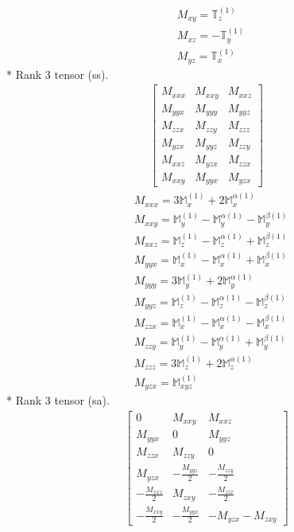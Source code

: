 \documentclass[fleqn,8pt,landscape]{jsarticle}
\begin{document}
\begin{align*}
& M_{xy} = \mathbb{T}_{z}^{(1)} \\
& M_{xz} = - \mathbb{T}_{y}^{(1)} \\
& M_{yz} = \mathbb{T}_{x}^{(1)}
\end{align*}
* Rank 3 tensor (ss).
\begin{align*}
\begin{bmatrix} M_{xxx} & M_{xxy} & M_{xxz} \\ M_{yyx} & M_{yyy} & M_{yyz} \\ M_{zzx} & M_{zzy} & M_{zzz} \\ M_{yzx} & M_{yyz} & M_{zzy} \\ M_{xxz} & M_{yzx} & M_{zzx} \\ M_{xxy} & M_{yyx} & M_{yzx} \end{bmatrix}
\end{align*}
\begin{align*}
& M_{xxx} = 3 \mathbb{M}_{x}^{(1)} + 2 \mathbb{M}_{x}^{\alpha(1)} \\
& M_{xxy} = \mathbb{M}_{y}^{(1)} - \mathbb{M}_{y}^{\alpha(1)} - \mathbb{M}_{y}^{\beta(1)} \\
& M_{xxz} = \mathbb{M}_{z}^{(1)} - \mathbb{M}_{z}^{\alpha(1)} + \mathbb{M}_{z}^{\beta(1)} \\
& M_{yyx} = \mathbb{M}_{x}^{(1)} - \mathbb{M}_{x}^{\alpha(1)} + \mathbb{M}_{x}^{\beta(1)} \\
& M_{yyy} = 3 \mathbb{M}_{y}^{(1)} + 2 \mathbb{M}_{y}^{\alpha(1)} \\
& M_{yyz} = \mathbb{M}_{z}^{(1)} - \mathbb{M}_{z}^{\alpha(1)} - \mathbb{M}_{z}^{\beta(1)} \\
& M_{zzx} = \mathbb{M}_{x}^{(1)} - \mathbb{M}_{x}^{\alpha(1)} - \mathbb{M}_{x}^{\beta(1)} \\
& M_{zzy} = \mathbb{M}_{y}^{(1)} - \mathbb{M}_{y}^{\alpha(1)} + \mathbb{M}_{y}^{\beta(1)} \\
& M_{zzz} = 3 \mathbb{M}_{z}^{(1)} + 2 \mathbb{M}_{z}^{\alpha(1)} \\
& M_{yzx} = \mathbb{M}_{xyz}^{(1)}
\end{align*}
* Rank 3 tensor (sa).
\begin{align*}
\begin{bmatrix} 0 & M_{xxy} & M_{xxz} \\ M_{yyx} & 0 & M_{yyz} \\ M_{zzx} & M_{zzy} & 0 \\ M_{yzx} & - \frac{M_{yyz}}{2} & - \frac{M_{zzy}}{2} \\ - \frac{M_{xxz}}{2} & M_{zxy} & - \frac{M_{zzx}}{2} \\ - \frac{M_{xxy}}{2} & - \frac{M_{yyx}}{2} & - M_{yzx} - M_{zxy} \end{bmatrix}
\end{align*}
\end{document}
